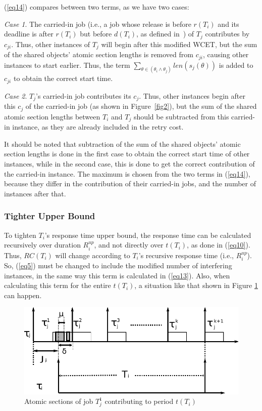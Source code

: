 \documentclass[a4paper,english]{article}
\begin{document}
(\ref{eq14}) compares between two terms, as we have two cases:


\textit{Case 1}. The carried-in job (i.e., a job whose release is before $r(T_i)$ and its deadline is after $r(T_i)$ but before $d(T_i)$, as defined in~\cite{key-2}) of $T_j$
contributes by $c_{ji}$. Thus, other instances of $T_j$ will begin after this modified WCET, but the sum of the shared objects' atomic section lengths is removed from $c_{ji}$, causing other instances to start earlier. Thus, the term $\sum_{\theta\in(\theta_i\wedge\theta_j)} {len(s_{j}(\theta))}$ is added to $c_{ji}$ to obtain the correct start time. 

\textit{Case 2}. $T_j$'s carried-in job contributes its $c_j$. Thus, other instances begin after this $c_j$ of the carried-in job (as shown in Figure~\ref{fig2}), but the sum of the shared atomic section lengths  between $T_i$ and $T_j$ should be subtracted from this carried-in
instance, as they are already included in the retry cost. 

It should be noted that subtraction of the sum of the shared objects' atomic section lengths is done in the first case to obtain the correct start time of other instances, while in the second case, this is done to get the correct contribution of the carried-in  instance. The maximum is chosen from the two terms in (\ref{eq14}), because they differ in the contribution of their carried-in jobs, and the number of instances after that.

\subsubsection{Tighter Upper Bound}

To tighten $T_{i}$'s response time upper bound, the response time can be calculated recursively over duration $R_i^{up}$, 
and not directly over $t(T_i)$, as done in (\ref{eq10}). Thus, $RC(T_{i})$ will change according
to $T_i$'s recursive response time (i.e., $R_{i}^{up}$). So, (\ref{eq5}) must be changed to include the modified number of interfering instances, in the same way this term  
is calculated in (\ref{eq13}). Also, when calculating this term 
for the entire $t(T_{i})$, a situation like that shown in Figure
\ref{fig10} can happen.
\begin{figure}
\centering{}\includegraphics[scale=0.5]{figures/figure10}\caption{\label{fig10} Atomic sections of job $T_{j}^{1}$ contributing to period $t(T_i)$}
\end{figure}
\end{document}
